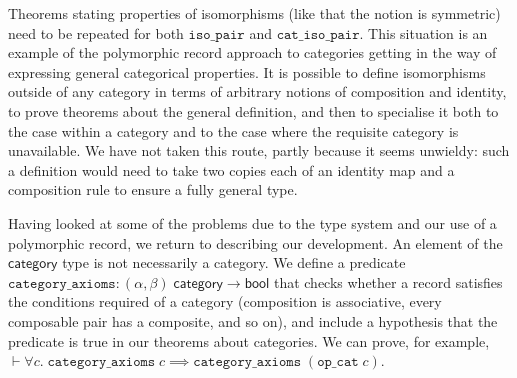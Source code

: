 \documentclass[twoside,titlepage,11pt]{article}
\begin{document}
Theorems stating properties of isomorphisms (like that the notion is symmetric) need to be repeated for both $\mathtt{iso\_pair}$ and $\mathtt{cat\_iso\_pair}$. 
This situation is an example of the polymorphic record approach to categories getting in the way of expressing general categorical properties.
It is possible to define isomorphisms outside of any category in terms of arbitrary notions of composition and identity, to prove theorems about the general definition, and then to specialise it both to the case within a category and to the case where the requisite category is unavailable.
We have not taken this route, partly because it seems unwieldy: such a definition would need to take two copies each of an identity map and a composition rule to ensure a fully general type.

Having looked at some of the problems due to the type system and our use of a polymorphic record, we return to describing our development.
An element of the $\mathsf{category}$ type is not necessarily a category.
We define a predicate $\mathtt{category\_axioms}:(\alpha,\beta)\;\mathsf{category}\to\mathsf{bool}$ that checks whether a record satisfies the conditions required of a category (composition is associative, every composable pair has a composite, and so on), and include a hypothesis that the predicate is true in our theorems about categories.
We can prove, for example, $\vdash\forall{c}.\;\mathtt{category\_axioms}\;c\implies\mathtt{category\_axioms}\;(\mathtt{op\_cat}\;c)$.
\end{document}
